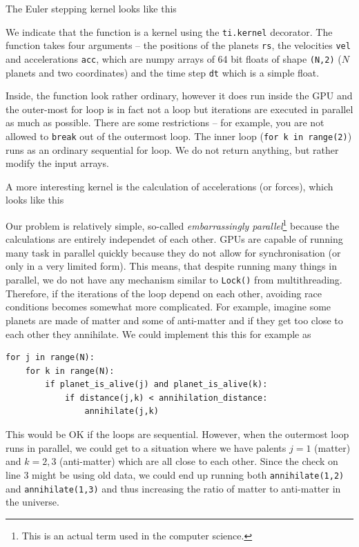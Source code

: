 \documentclass{article}
\newcommand{\ls}[1]{\lstinline{#1}}
\begin{document}
The Euler stepping kernel looks like this

We indicate that the function is a kernel using the \ls{ti.kernel} decorator. The function takes four arguments -- the positions of the planets \ls{rs}, the velocities \ls{vel} and accelerations \ls{acc}, which are numpy arrays of 64 bit floats of shape \ls{(N,2)} ($N$ planets and two coordinates) and the time step \ls{dt} which is a simple float.

Inside, the function look rather ordinary, however it does run inside the GPU and the outer-most for loop is in fact not a loop but iterations are executed in parallel as much as possible. There are some restrictions -- for example, you are not allowed to \ls{break} out of the outermost loop. The inner loop (\ls{for k in range(2)}) runs as an ordinary sequential for loop. We do not return anything, but rather modify the input arrays.

A more interesting kernel is the calculation of accelerations (or forces), which looks like this


Our problem is relatively simple, so-called \emph{embarrassingly parallel}\footnote{This is an actual term used in the computer science.} because the calculations are entirely independet of each other. GPUs are capable of running many task in parallel quickly because they do not allow for synchronisation (or only in a very limited form). This means, that despite running many things in parallel, we do not have any mechanism similar to \ls{Lock()} from multithreading. Therefore, if the iterations of the loop depend on each other, avoiding race conditions becomes somewhat more complicated. For example, imagine some planets are made of matter and some of anti-matter and if they get too close to each other they annihilate. We could implement this this for example as
\begin{lstlisting}
for j in range(N):
    for k in range(N):
        if planet_is_alive(j) and planet_is_alive(k):
            if distance(j,k) < annihilation_distance:
                annihilate(j,k)
\end{lstlisting}
This would be OK if the loops are sequential. However, when the outermost loop runs in parallel, we could get to a situation where we have palents $j=1$ (matter) and $k=2, 3$ (anti-matter) which are all close to each other. Since the check on line 3 might be using old data, we could end up running both \ls{annihilate(1,2)} and \ls{annihilate(1,3)} and thus increasing the ratio of matter to anti-matter in the universe.
\end{document}
